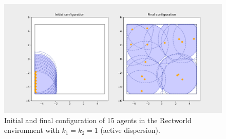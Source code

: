 \begin{figure}[H]
  \centering
  \includegraphics[width=\textwidth]{figs/bigworld_15_agnt_k_1_1_k_2_1_distr.pdf}
  \caption{Initial and final configuration of 15 agents in the Rectworld environment with $k_{1} = k_{2} = 1$ (active dispersion).}
  \label{fig:15_agnt_bw_k_1_1_k_2_1_distr}
\end{figure}
